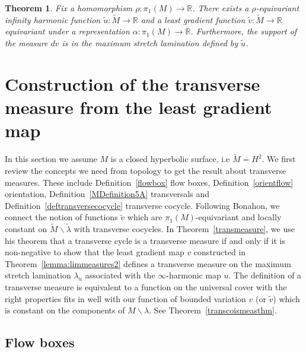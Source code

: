 \documentclass{ip-journal}
\newtheorem{theorem}{Theorem}[section]
\theoremstyle{definition}
\numberwithin{equation}{section}
\newcommand{\R}{\mathbb R}
\begin{document}
\begin{theorem}\label{thm:equivsit} Fix a homomorphism $\rho: \pi_1(M) \rightarrow \R$. There exists a $\rho$-equivariant infinity harmonic function $\tilde u: \tilde M \rightarrow \R$ and a least gradient function $\tilde v: \tilde M \rightarrow \R$ equivariant under a representation $\alpha: \pi_1(M) \rightarrow \R$. Furthermore, the support of the measure $dv$ is in the maximum stretch lamination defined by $\tilde u$.
\end{theorem}

 
\section{Construction of the transverse measure from the least gradient map}\label{sect7} 
In this section we assume $M$ is a closed hyperbolic surface, i.e $\tilde M=H^2$. We first review the concepts we need from topology to get the result about transverse measures.  These include Definition~\ref{flowbox}  flow boxes, Definition~\ref{orientflow} orientation, Definition~\ref{MDefinition5A}  transversals and Definition~\ref{deftransversecocycle} transverse cocycle. Following Bonahon, we connect the notion of  functions $\tilde v$ which are $\pi_1(M)$-equivariant and locally constant on $\tilde M \backslash \tilde \lambda$ with transverse cocycles.  In Theorem~\ref{transmeasure}, we use his theorem that a transverse cycle is a transverse measure if and only if it is non-negative to show that the least gradient map $v$ constructed in Theorem~\ref{lemma:limmeasures2} defines a transverse measure on the maximum stretch lamination $\lambda_u$ associated with the $\infty$-harmonic map $u$.   The definition of a transverse measure is equivalent to a function   on the universal cover with the right properties fits in well with our function of bounded variation $v$ (or $\tilde v$) which is constant on the components of $ M \backslash  \lambda$. See Theorem~\ref{transcoismeasthm}.

  \subsection{Flow boxes}
  
\end{document}

